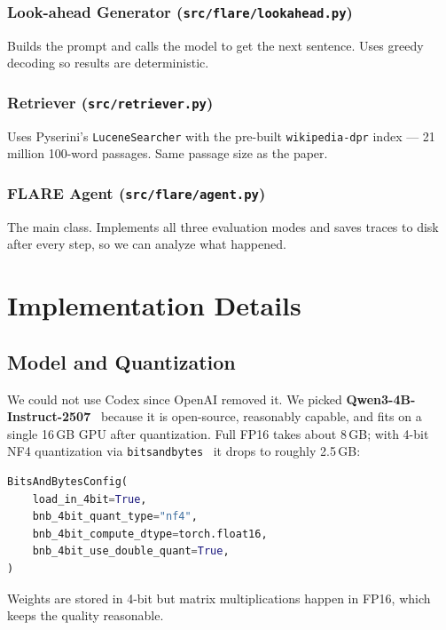 \documentclass[conference]{IEEEtran}
\begin{document}
\subsubsection*{Look-ahead Generator (\texttt{src/flare/lookahead.py})}
Builds the prompt and calls the model to get the next sentence.
Uses greedy decoding so results are deterministic.

\subsubsection*{Retriever (\texttt{src/retriever.py})}
Uses Pyserini's \texttt{LuceneSearcher} with the pre-built
\texttt{wikipedia-dpr} index — 21 million 100-word passages.
Same passage size as the paper.

\subsubsection*{FLARE Agent (\texttt{src/flare/agent.py})}
The main class. Implements all three evaluation modes and saves
traces to disk after every step, so we can analyze what happened.

\section{Implementation Details}
\label{sec:implementation}

\subsection{Model and Quantization}

We could not use Codex since OpenAI removed it. We picked
\textbf{Qwen3-4B-Instruct-2507}~\cite{qwen3} because it is
open-source, reasonably capable, and fits on a single 16\,GB GPU
after quantization. Full FP16 takes about 8\,GB; with 4-bit NF4
quantization via \texttt{bitsandbytes}~\cite{dettmers2024qlora}
it drops to roughly 2.5\,GB:

\begin{lstlisting}[language=Python, caption={NF4 quantization config (src/models/qwen.py)}]
BitsAndBytesConfig(
    load_in_4bit=True,
    bnb_4bit_quant_type="nf4",
    bnb_4bit_compute_dtype=torch.float16,
    bnb_4bit_use_double_quant=True,
)
\end{lstlisting}

Weights are stored in 4-bit but matrix multiplications happen in
FP16, which keeps the quality reasonable.
\end{document}

